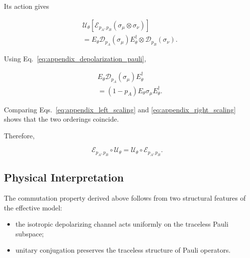 Its action gives

\begin{align}
&
\mathcal{U}_{\theta}
\left[
\mathcal{E}_{p_A,p_B}
\left(
\sigma_{\mu}\otimes\sigma_{\nu}
\right)
\right]
\nonumber
\\
&=
E_{\theta}
\mathcal{D}_{p_A}(\sigma_{\mu})
E_{\theta}^{\dagger}
\otimes
\mathcal{D}_{p_B}(\sigma_{\nu}).
\label{eq:appendix_right_order}
\end{align}

Using Eq.~\eqref{eq:appendix_depolarization_pauli},

\begin{align}
&
E_{\theta}
\mathcal{D}_{p_A}(\sigma_{\mu})
E_{\theta}^{\dagger}
\nonumber
\\
&=
(1-p_A)
E_{\theta}\sigma_{\mu}E_{\theta}^{\dagger}.
\label{eq:appendix_right_scaling}
\end{align}

Comparing Eqs.~\eqref{eq:appendix_left_scaling} and
\eqref{eq:appendix_right_scaling} shows that the two orderings coincide.

\medskip

Therefore,

\begin{equation}
\mathcal{E}_{p_A,p_B}
\circ
\mathcal{U}_{\theta}
=
\mathcal{U}_{\theta}
\circ
\mathcal{E}_{p_A,p_B}.
\label{eq:appendix_final_commutation}
\end{equation}


\subsection*{Physical Interpretation}

The commutation property derived above follows from two structural features of the effective model:

\begin{itemize}

\item the isotropic depolarizing channel acts uniformly on the traceless Pauli subspace;

\item unitary conjugation preserves the traceless structure of Pauli operators.

\end{itemize}

\medskip

